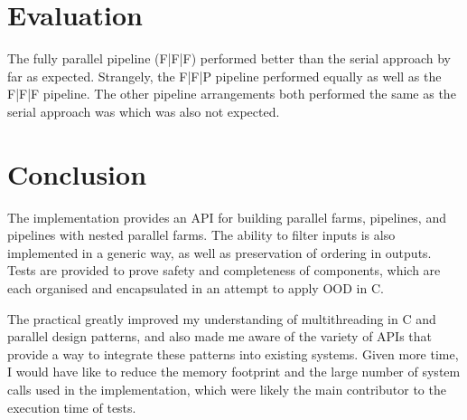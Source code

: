 \documentclass[12pt]{article}
\begin{document}
\section{Evaluation}

The fully parallel pipeline (F|F|F) performed better than the serial approach by far as expected. Strangely, the F|F|P pipeline performed equally as well as the F|F|F pipeline. The other pipeline arrangements both performed the same as the serial approach was which was also not expected.

\section{Conclusion} 
 
The implementation provides an API for building parallel farms, pipelines, and pipelines with nested parallel farms. The ability to filter inputs is also implemented in a generic way, as well as preservation of ordering in outputs. Tests are provided to prove safety and completeness of components, which are each organised and encapsulated in an attempt to apply OOD in C.

The practical greatly improved my understanding of multithreading in C and parallel design patterns, and also made me aware of the variety of APIs that provide a way to integrate these patterns into existing systems. Given more time, I would have like to reduce the memory footprint and the large number of system calls used in the implementation, which were likely the main contributor to the execution time of tests. 



\end{document}
